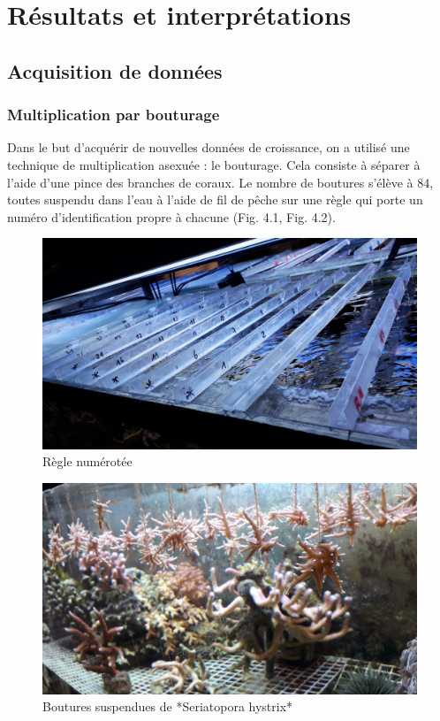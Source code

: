 \documentclass[]{report}
\begin{document}
\chapter{Résultats et
interprétations}\label{resultats-et-interpretations}

\section{Acquisition de données}\label{acquisition-de-donnees}

\subsection{Multiplication par
bouturage}\label{multiplication-par-bouturage}

Dans le but d'acquérir de nouvelles données de croissance, on a utilisé
une technique de multiplication asexuée : le bouturage. Cela consiste à
séparer à l'aide d'une pince des branches de coraux. Le nombre de
boutures s'élève à 84, toutes suspendu dans l'eau à l'aide de fil de
pêche sur une règle qui porte un numéro d'identification propre à
chacune (Fig. 4.1, Fig. 4.2).

\begin{figure}[h!]
\includegraphics[]{../image/regle.jpg}
\caption{Règle numérotée}
\end{figure}

\begin{figure}[h!]
\includegraphics[]{../image/boutures.jpg}
\caption{Boutures suspendues de *Seriatopora hystrix*}
\end{figure}
\end{document}
